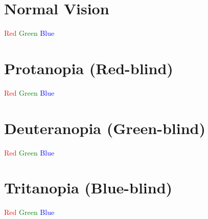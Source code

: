 \documentclass{article}
\begin{document}
\section{Normal Vision}
\cvddisable
\textcolor{red}{Red} \textcolor{green}{Green} \textcolor{blue}{Blue}

\section{Protanopia (Red-blind)}
\cvdenable
{}
\textcolor{red}{Red} \textcolor{green}{Green} \textcolor{blue}{Blue}

\section{Deuteranopia (Green-blind)}
\textcolor{red}{Red} \textcolor{green}{Green} \textcolor{blue}{Blue}

\section{Tritanopia (Blue-blind)}
\textcolor{red}{Red} \textcolor{green}{Green} \textcolor{blue}{Blue}
\end{document}
